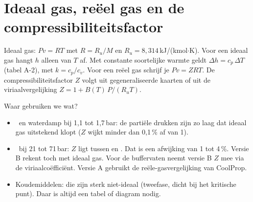 \section{Ideaal gas, reëel gas en de compressibiliteitsfactor}
\begin{methode}[– Cengel H3 en H4]
Ideaal gas: $P v = R T$ met $R = R_u/M$ en $R_u = 8{,}314$\,kJ/(kmol$\cdot$K). Voor een ideaal gas hangt $h$
alleen van $T$ af. Met constante soortelijke warmte geldt $\Delta h = c_p\,\Delta T$ (tabel A-2), met
$k = c_p/c_v$. Voor een reëel gas schrijf je $P v = Z R T$. De compressibiliteitsfactor $Z$ volgt uit
gegeneraliseerde kaarten of uit de viriaalvergelijking $Z = 1 + B(T)\,P/(R_u T)$.
\end{methode}
Waar gebruiken we wat?
\begin{itemize}
  \item \OO\ en waterdamp bij 1,1 tot 1,7\,bar: de partiële drukken zijn zo laag dat ideaal gas uitstekend klopt
        ($Z$ wijkt minder dan 0,1\,\% af van 1).
  \item \HH\ bij 21 tot 71\,bar: $Z$ ligt tussen  en . Dat is een
        afwijking van 1 tot 4\,\%. Versie B rekent toch met ideaal gas. Voor de buffervaten neemt versie B
        $Z$ mee via de viriaalcoëfficiënt. Versie A gebruikt de reële-gasvergelijking van CoolProp.
  \item Koudemiddelen: die zijn sterk niet-ideaal (tweefase, dicht bij het kritische punt). Daar is altijd een
        tabel of diagram nodig.
\end{itemize}

